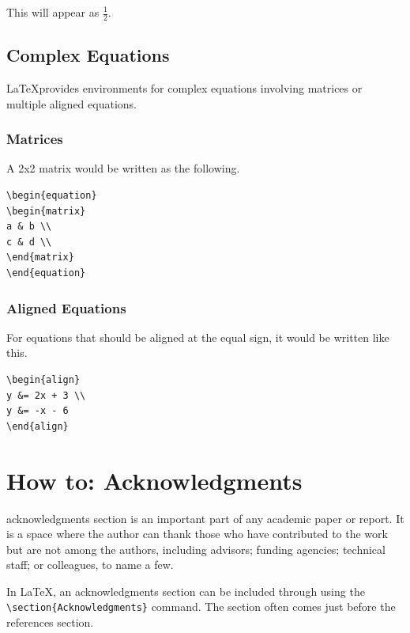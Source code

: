 \documentclass[12pt,journal,compsoc]{IEEEtran}
\begin{document}
This will appear as \( \frac{1}{2} \). 

\subsection{Complex Equations}
\LaTeX provides environments for complex equations involving matrices or multiple aligned equations.

\subsubsection{Matrices}
A 2x2 matrix would be written as the following. 

\begin{verbatim}
\begin{equation}
\begin{matrix}
a & b \\
c & d \\
\end{matrix}
\end{equation}
\end{verbatim}

\subsubsection{Aligned Equations}
For equations that should be aligned at the equal sign, it would be written like this. 

\begin{verbatim}
\begin{align}
y &= 2x + 3 \\
y &= -x - 6
\end{align}
\end{verbatim}

\section{How to: Acknowledgments}

 acknowledgments section is an important part of any academic paper or report. It is a space where the author can thank those who have contributed to the work but are not among the authors, including advisors; funding agencies; technical staff; or colleagues, to name a few. 

In \LaTeX, an acknowledgments section can be included through using the \texttt{\textbackslash section\{Acknowledgments\}} command. The section often comes just before the references section.
\end{document}
